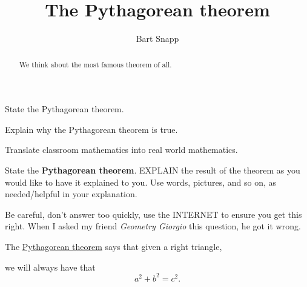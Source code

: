 \documentclass[noauthor,nooutcomes,handout,hints]{ximera}
\title{The Pythagorean theorem}
\author{Bart Snapp}
\begin{document}
\begin{abstract}
  We think about the most famous theorem of all.
\end{abstract}
\maketitle


\begin{listOutcomes}
\item{State the Pythagorean theorem.}
\item{Explain why the Pythagorean theorem is true.}
\item{Translate classroom mathematics into real world mathematics.}
\end{listOutcomes}
\mynewpage

\begin{question}
  State the \textbf{Pythagorean theorem}. EXPLAIN the result of the theorem as
  you would like to have it explained to you.  Use words, pictures,
  and so on, as needed/helpful in your explanation.
  \begin{hint}
    Be careful, don't answer too quickly, use the INTERNET to ensure
    you get this right. When I asked my friend \textit{Geometry Giorgio} this
    question, he got it wrong.
  \end{hint}
  \begin{freeResponse}
    The \underline{Pythagorean theorem} says that given a right
    triangle,
    \begin{center}
    \end{center}
    we will always have that
    \[
    a^2 + b^2 = c^2.
    \]
  \end{freeResponse}
\end{question}
\mynewpage
\end{document}
